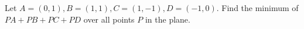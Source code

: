 Let $A=(0,1),B=(1,1),C=(1,-1),D=(-1,0)$. Find the minimum of $PA+PB+PC+PD$ over all points $P$ in the plane.
